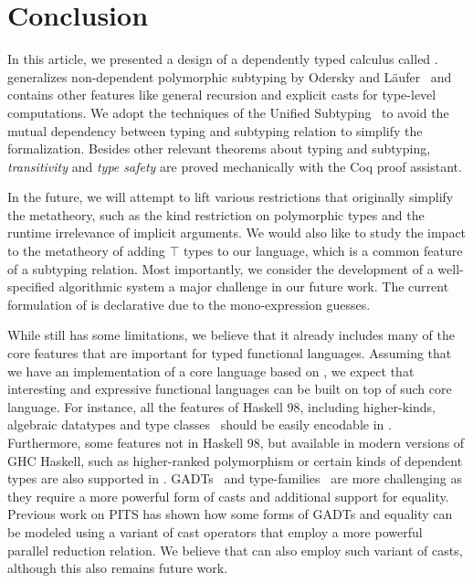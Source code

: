 \section{Conclusion}

In this article, we presented a design of a dependently typed calculus called \name.
\name generalizes non-dependent polymorphic subtyping by Odersky and
L\"aufer~\citep{odersky1996putting} and contains other features like general
recursion and explicit casts for type-level computations.
We adopt the techniques of the Unified Subtyping~\citep{full} to
avoid the mutual dependency between typing and subtyping relation to simplify
the formalization. Besides other relevant theorems about typing and subtyping,
\emph{transitivity} and \emph{type safety} are proved mechanically with the Coq
proof assistant.

In the future, we will attempt to lift various restrictions that originally simplify
the metatheory, such as the kind restriction on polymorphic
types and the runtime irrelevance of implicit arguments. We would also like to
study the impact to the metatheory of adding $\top$ types to our language,
which is a common feature of a subtyping relation.
Most importantly, we consider the development
of a well-specified algorithmic system a major challenge in our future
work. The current formulation of \name is declarative due to the mono-expression guesses.

While \name still has some limitations, we believe that it already includes many
of the core features that are important for typed functional languages.
Assuming that we have an implementation of a core language based on \name,
we expect that interesting and expressive functional languages can be built
on top of such core language. For instance, all the features of Haskell 98,
including higher-kinds, algebraic datatypes and type classes~\citep{typeclasseskaes,typeclasseswadler}
should be easily encodable
in \name. Furthermore, some features not in Haskell 98, but available in modern
versions of GHC Haskell, such as higher-ranked polymorphism or certain
kinds of dependent types are also supported in \name. GADTs~\citep{gadt1,gadt2} and
type-families~\citep{typefamilies} are more challenging as they require a more powerful
form of casts and additional support for equality. Previous work on PITS
has shown how some forms of GADTs and equality can be modeled using
a variant of cast operators that employ a more powerful parallel reduction
relation. We believe that \name can also employ such variant of casts,
although this also remains future work.
